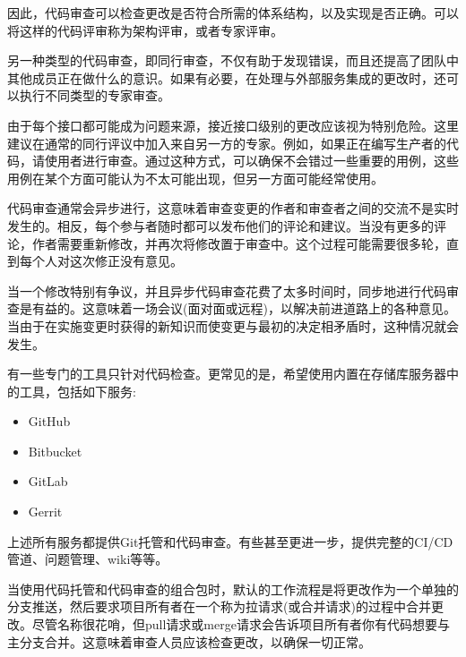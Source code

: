 因此，代码审查可以检查更改是否符合所需的体系结构，以及实现是否正确。可以将这样的代码评审称为架构评审，或者专家评审。

另一种类型的代码审查，即同行审查，不仅有助于发现错误，而且还提高了团队中其他成员正在做什么的意识。如果有必要，在处理与外部服务集成的更改时，还可以执行不同类型的专家审查。

由于每个接口都可能成为问题来源，接近接口级别的更改应该视为特别危险。这里建议在通常的同行评议中加入来自另一方的专家。例如，如果正在编写生产者的代码，请使用者进行审查。通过这种方式，可以确保不会错过一些重要的用例，这些用例在某个方面可能认为不太可能出现，但另一方面可能经常使用。


代码审查通常会异步进行，这意味着审查变更的作者和审查者之间的交流不是实时发生的。相反，每个参与者随时都可以发布他们的评论和建议。当没有更多的评论，作者需要重新修改，并再次将修改置于审查中。这个过程可能需要很多轮，直到每个人对这次修正没有意见。

当一个修改特别有争议，并且异步代码审查花费了太多时间时，同步地进行代码审查是有益的。这意味着一场会议(面对面或远程)，以解决前进道路上的各种意见。当由于在实施变更时获得的新知识而使变更与最初的决定相矛盾时，这种情况就会发生。

有一些专门的工具只针对代码检查。更常见的是，希望使用内置在存储库服务器中的工具，包括如下服务:

\begin{itemize}
\item 
GitHub

\item 
Bitbucket

\item 
GitLab

\item 
Gerrit
\end{itemize}

上述所有服务都提供Git托管和代码审查。有些甚至更进一步，提供完整的CI/CD管道、问题管理、wiki等等。

当使用代码托管和代码审查的组合包时，默认的工作流程是将更改作为一个单独的分支推送，然后要求项目所有者在一个称为拉请求(或合并请求)的过程中合并更改。尽管名称很花哨，但pull请求或merge请求会告诉项目所有者你有代码想要与主分支合并。这意味着审查人员应该检查更改，以确保一切正常。


